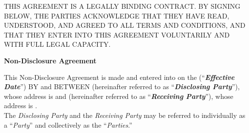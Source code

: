 
\begin{sloppypar}
THIS AGREEMENT IS A LEGALLY BINDING CONTRACT. BY SIGNING BELOW, THE PARTIES ACKNOWLEDGE THAT THEY HAVE READ, UNDERSTOOD, AND AGREED TO ALL TERMS AND CONDITIONS, AND THAT THEY ENTER INTO THIS AGREEMENT VOLUNTARILY AND WITH FULL LEGAL CAPACITY.
\end{sloppypar}

\begin{center}

\textbf{Non-Disclosure Agreement}

\end{center}

\begin{sloppypar}
This Non-Disclosure Agreement is made and entered into on the \AgreementDate{} (“\textbf{\textit{Effective Date}}”) BY and BETWEEN \DisclosingName{} (hereinafter referred to as “\textbf{\textit{Disclosing Party}}”), whose address is \DisclosingAddress{} and \ReceivingName{} (hereinafter referred to as  “\textbf{\textit{Receiving Party}}”), whose address is \ReceivingAddress{}.
\\

The \textit{Disclosing Party} and the \textit{Receiving Party} may be referred to individually as a “\textit{Party}” and collectively as the “\textit{Parties}.”

\end{sloppypar}

